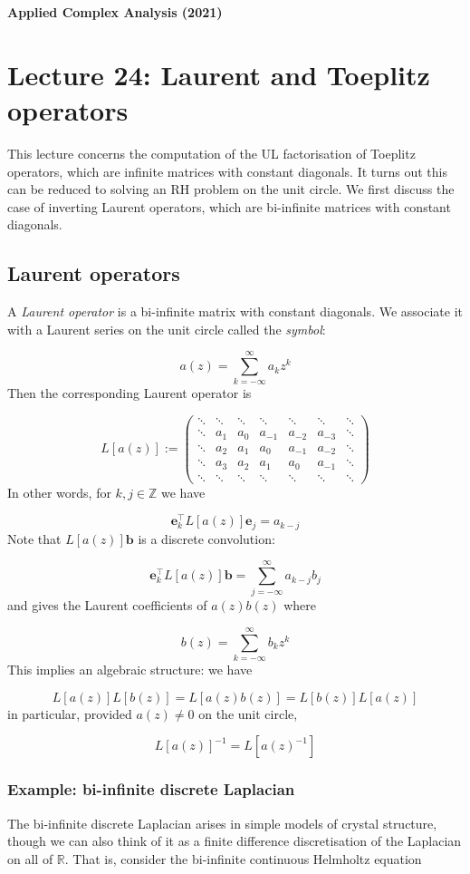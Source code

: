 \documentclass[12pt,landscape]{article}
\def\R{ {\mathbb R} }
\def\Z{ {\mathbb Z} }
\def\vc#1{ {\mathbf #1} }
\def\sopmatrix#1{ \begin{pmatrix}#1\end{pmatrix} }
\begin{document}
{\LARGE
\sf
\textbf{Applied Complex Analysis (2021)}

\section{Lecture 24: Laurent and Toeplitz operators}
This lecture concerns the computation of the UL factorisation of Toeplitz operators, which are infinite matrices with constant diagonals. It turns out this can be reduced to solving an RH problem on the unit circle.  We first discuss the case of inverting Laurent operators, which are bi-infinite matrices with constant diagonals.

\subsection{Laurent operators}
A \emph{Laurent operator} is a bi-infinite matrix with constant diagonals. We associate it with a Laurent series on the unit circle called the \emph{symbol}:

\[
a(z) = \sum_{k=-\infty}^\infty a_k z^k
\]
Then the corresponding Laurent operator is

\[
L[a(z)] := \sopmatrix{
\ddots & \ddots & \ddots& \ddots& \ddots& \ddots& \ddots \\
\ddots  & a_1 & a_0 & a_{-1} & a_{-2} & a_{-3} & \ddots \\
\ddots  & a_2 & a_1 & a_0 & a_{-1} & a_{-2} & \ddots \\
\ddots  & a_3 & a_2 & a_1 & a_0 & a_{-1} &  \ddots \\
\ddots & \ddots & \ddots& \ddots& \ddots& \ddots& \ddots
}
\]
In other words, for $k,j \in \Z$ we have

\[
\vc e_k^\top L[a(z)] \vc e_j = a_{k-j}
\]
Note that $L[a(z)] \vc b$ is a discrete convolution:

\[
\vc e_k^\top L[a(z)] \vc b = \sum_{j=-\infty}^\infty a_{k-j} b_j
\]
and gives the Laurent coefficients of $a(z) b(z)$ where

\[
b(z) = \sum_{k=-\infty}^\infty b_k z^k
\]
This implies an algebraic structure: we have

\[
L[a(z)] L[b(z)] = L[a(z)b(z)] = L[b(z)] L[a(z)]
\]
in particular, provided $a(z) \neq 0$ on the unit circle,

\[
L[a(z)]^{-1} = L[a(z)^{-1}]
\]
\subsubsection{Example: bi-infinite discrete Laplacian}
The bi-infinite discrete Laplacian arises in simple models of crystal structure, though we can also think of it as a finite difference discretisation of the Laplacian on all of $\R$. That is, consider the bi-infinite continuous Helmholtz equation

}
\end{document}
